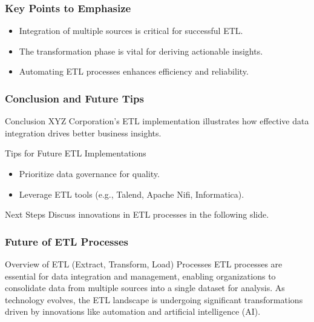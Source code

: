 \documentclass[aspectratio=169]{beamer}
\begin{document}
\begin{frame}[fragile]
    \frametitle{Key Points to Emphasize}
    \begin{itemize}
        \item Integration of multiple sources is critical for successful ETL.
        \item The transformation phase is vital for deriving actionable insights.
        \item Automating ETL processes enhances efficiency and reliability.
    \end{itemize}
\end{frame}

\begin{frame}[fragile]
    \frametitle{Conclusion and Future Tips}
    \begin{block}{Conclusion}
        XYZ Corporation's ETL implementation illustrates how effective data integration drives better business insights.
    \end{block}

    \begin{block}{Tips for Future ETL Implementations}
        \begin{itemize}
            \item Prioritize data governance for quality.
            \item Leverage ETL tools (e.g., Talend, Apache Nifi, Informatica).
        \end{itemize}
    \end{block}

    \begin{block}{Next Steps}
        Discuss innovations in ETL processes in the following slide.
    \end{block}
\end{frame}

\begin{frame}[fragile]
    \frametitle{Future of ETL Processes}
    \begin{block}{Overview of ETL (Extract, Transform, Load) Processes}
        ETL processes are essential for data integration and management, enabling organizations to consolidate data from multiple sources into a single dataset for analysis. As technology evolves, the ETL landscape is undergoing significant transformations driven by innovations like automation and artificial intelligence (AI).
    \end{block}
\end{frame}
\end{document}
